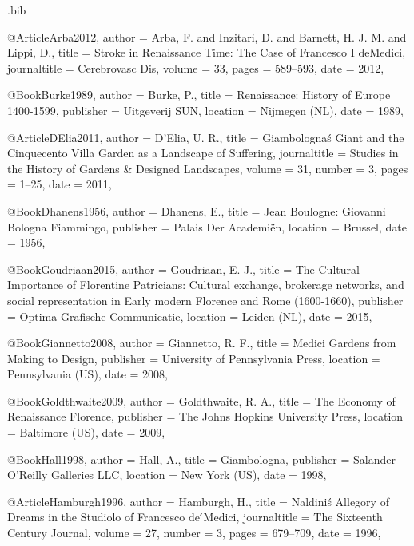 \begin{filecontents}{\IJSRAidentifier.bib}

@Article{Arba2012,
  author       = {Arba, F. and Inzitari, D. and Barnett, H. J. M. and Lippi, D.},
  title        = {Stroke in Renaissance Time: The Case of Francesco I deMedici},
  journaltitle = {Cerebrovasc Dis},
  volume       = {33},
  pages        = {589--593},
  date         = {2012},
}

@Book{Burke1989,
  author    = {Burke, P.},
  title     = {Renaissance: History of Europe 1400-1599},
  publisher = {Uitgeverij SUN},
  location  = {Nijmegen (NL)},
  date      = {1989},
}

@Article{DElia2011,
  author       = {D'Elia, U. R.},
  title        = {Giambolognaś Giant and the Cinquecento Villa Garden as a Landscape of Suffering},
  journaltitle = {Studies in the History of Gardens \& Designed Landscapes},
  volume       = {31},
  number       = {3},
  pages        = {1--25},
  date         = {2011},
}

@Book{Dhanens1956,
  author    = {Dhanens, E.},
  title     = {Jean Boulogne: Giovanni Bologna Fiammingo},
  publisher = {Palais Der Academiën},
  location  = {Brussel},
  date      = {1956},
}

@Book{Goudriaan2015,
  author    = {Goudriaan, E. J.},
  title     = {The Cultural Importance of Florentine Patricians: Cultural exchange, brokerage networks, and social representation in Early modern Florence and Rome (1600-1660)},
  publisher = {Optima Grafische Communicatie},
  location  = {Leiden (NL)},
  date      = {2015},
}

@Book{Giannetto2008,
  author    = {Giannetto, R. F.},
  title     = {Medici Gardens from Making to Design},
  publisher = {University of Pennsylvania Press},
  location  = {Pennsylvania (US)},
  date      = {2008},
}

@Book{Goldthwaite2009,
  author    = {Goldthwaite, R. A.},
  title     = {The Economy of Renaissance Florence},
  publisher = {The Johns Hopkins University Press},
  location  = {Baltimore (US)},
  date      = {2009},
}

@Book{Hall1998,
  author    = {Hall, A.},
  title     = {Giambologna},
  publisher = {Salander-O'Reilly Galleries LLC},
  location  = {New York (US)},
  date      = {1998},
}

@Article{Hamburgh1996,
  author       = {Hamburgh, H.},
  title        = {Naldiniś Allegory of Dreams in the Studiolo of Francesco de ́Medici},
  journaltitle = {The Sixteenth Century Journal},
  volume       = {27},
  number       = {3},
  pages        = {679--709},
  date         = {1996},
}


\end{filecontents}
